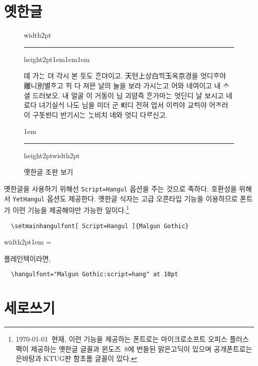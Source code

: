 \documentclass[a4paper]{article}
\def\grayhrule{\color{white!80!black}\hrule height2pt\color{black}}
\def\grayvrule{\color{white!80!black}\vrule width2pt\color{black}}
\newenvironment{plaintex}
  {\par\medskip\leavevmode\hbox\bgroup\grayvrule\kern1em
    \vbox\bgroup\hsize=\dimexpr\textwidth-12pt\relax\small
  }{\egroup\egroup\par\medskip}
\newenvironment{example}
  {\leavevmode\hbox\bgroup\grayvrule
    \vbox\bgroup\hsize\dimexpr\textwidth-4pt\relax
    \grayhrule\kern1em\leftskip1em\rightskip1em
  }{\par\kern1em\grayhrule\egroup\grayvrule\egroup}
\begin{document}
\section{옛한글}

\begin{figure}
  \begin{example}
    \hanjabyhangulfont%
    \obeylines\centering
뎨 가ᄂᆞᆫ 뎌 각시 본 듯도 ᄒᆞᆫ뎌이고.
天텬上상白ᄇᆡᆨ玉옥京경을 엇디ᄒᆞ야 離니別별ᄒᆞ고
ᄒᆡ 다 져믄 날의 눌을 보라 가시ᄂᆞᆫ고
\medbreak
어와 네여이고 내 ᄉᆞ셜 드러보오.
내 얼굴 이 거동이 님 괴얌즉 ᄒᆞᆫ가마ᄂᆞᆫ
엇딘디 날 보시고 네로다 녀기실ᄉᆡ
나도 님을 미더 군 ᄠᅥ디 전혀 업서
이ᄅᆡ야 교ᄐᆡ야 어ᄌᆞ러이 구돗ᄯᅥᆫ디
반기시ᄂᆞᆫ ᄂᆞᆺ비치 녜와 엇디 다ᄅᆞ신고.
  \end{example}
  \caption{옛한글 조판 보기}\label{fig:yethangul}
\end{figure}

옛한글을 사용하기 위해선 \verb|Script=Hangul| 옵션을 주는 것으로 족하다.
호환성을 위해서 \verb|YetHangul| 옵션도 제공한다.
옛한글 식자는 고급 오픈타입 기능을 이용하므로
폰트가 이런 기능을 제공해야만 가능한 일이다.\footnote{%
\today\ 현재, 이런 기능을 제공하는 폰트로는 마이크로소프트 오피스 플러스팩이
제공하는 옛한글 글꼴과 윈도즈~8에 번들된 맑은고딕이 있으며
공개폰트로는 은바탕과 KTUG판 함초롬 글꼴이 있다.}
\begin{verbatim}
  \setmainhangulfont[ Script=Hangul ]{Malgun Gothic}
\end{verbatim}
\begin{plaintex}
플레인텍이라면,
\begin{verbatim}
  \hangulfont="Malgun Gothic:script=hang" at 10pt
\end{verbatim}
\end{plaintex}

\section{세로쓰기}
\end{document}
